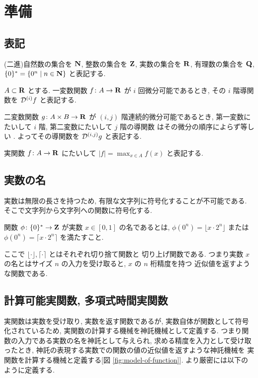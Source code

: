 \section{準備}
\label{section: preliminaries}

\subsection{表記}
(二進)自然数の集合を $\mathbf N$, 整数の集合を $\mathbf Z$, 実数の集合を $\mathbf R$, 
有理数の集合を $\mathbf Q$, $\{0\}^* = \{0^n \mid n \in \mathbf N\}$ と表記する. 

$A \subset \mathbf R$ とする. 一変数関数 $f\colon A \to \mathbf R$ が $i$ 回微分可能であるとき,
その $i$ 階導関数を $\mathcal D^{(i)}f$ と表記する.

二変数関数 $g \colon A \times B \to \mathbf R$ が
 $(i, j)$ 階連続的微分可能であるとき,
第一変数にたいして $i$ 階, 第二変数にたいして $j$ 階の導関数
はその微分の順序によらず等しい \cite{takagi1968analysis}.
よってその導関数を $\mathcal D^{(i,j)}g$ と表記する.

実関数 $f \colon A \to \mathbf R$ にたいして $|f| = \max_{x \in A} f(x)$ と表記する.

\subsection{実数の名}
 実数は無限の長さを持つため, 有限な文字列に符号化することが不可能である.
 そこで文字列から文字列への関数に符号化する.
 \begin{definition}[実数の名]
  関数 $\phi \colon \{0\}^* \to \mathbf Z $ が実数 $x \in [0,1]$ の名であるとは,
  $\phi(0^n) = \lfloor x \cdot 2^n \rfloor$ または
  $\phi(0^n) = \lceil x \cdot 2^n \rceil$ を満たすこと.
 \end{definition}
  ここで $\lfloor \cdot \rfloor, \lceil \cdot \rceil$ とはそれぞれ切り捨て関数と
 切り上げ関数である.
 つまり実数 $x$ の名とはサイズ $n$ の入力を受け取ると, $x$ の $n$ 桁精度を持つ
 近似値を返すような関数である.
 

\subsection{計算可能実関数, 多項式時間実関数}

 実関数は実数を受け取り, 実数を返す関数であるが,
 実数自体が関数として符号化されているため,
 実関数の計算する機械を神託機械として定義する.
 つまり関数の入力である実数の名を神託として与えられ,
 求める精度を入力として受け取ったとき,
 神託の表現する実数での関数の値の近似値を返すような神託機械を
 実関数を計算する機械と定義する[図 \ref{fig:model-of-function}].
 より厳密には以下のように定義する.

